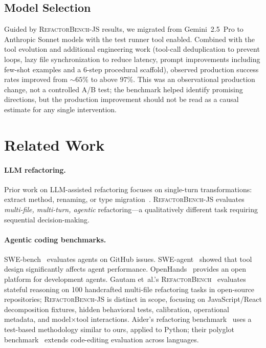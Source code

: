 \documentclass[11pt,letterpaper]{article}
\begin{document}
\subsection{Model Selection}

Guided by \textsc{RefactorBench}-JS results, we migrated from Gemini~2.5~Pro to Anthropic Sonnet models with the test runner tool enabled. Combined with the tool evolution and additional engineering work (tool-call deduplication to prevent loops, lazy file synchronization to reduce latency, prompt improvements including few-shot examples and a 6-step procedural scaffold), observed production success rates improved from ${\sim}65\%$ to above $97\%$. This was an observational production change, not a controlled A/B test; the benchmark helped identify promising directions, but the production improvement should not be read as a causal estimate for any single intervention.

\section{Related Work}

\paragraph{LLM refactoring.} Prior work on LLM-assisted refactoring focuses on single-turn transformations: extract method, renaming, or type migration~\citep{shirafuji2023refactoring,pomian2024together}. \textsc{RefactorBench}-JS evaluates \emph{multi-file, multi-turn, agentic} refactoring---a qualitatively different task requiring sequential decision-making.

\paragraph{Agentic coding benchmarks.} SWE-bench~\citep{jimenez2024swebench} evaluates agents on GitHub issues. SWE-agent~\citep{yang2024sweagent} showed that tool design significantly affects agent performance. OpenHands~\citep{wang2024openhands} provides an open platform for development agents. Gautam et~al.'s \textsc{RefactorBench}~\citep{gautam2025refactorbench} evaluates stateful reasoning on 100 handcrafted multi-file refactoring tasks in open-source repositories; \textsc{RefactorBench}-JS is distinct in scope, focusing on JavaScript/React decomposition fixtures, hidden behavioral tests, calibration, operational metadata, and model$\times$tool interactions. Aider's refactoring benchmark~\citep{gauthier2024aider} uses a test-based methodology similar to ours, applied to Python; their polyglot benchmark~\citep{gauthier2024polyglot} extends code-editing evaluation across languages.
\end{document}
